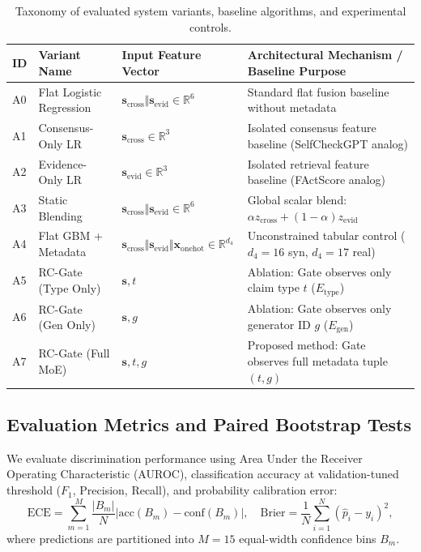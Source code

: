 \documentclass[pdflatex,sn-mathphys,Numbered]{sn-jnl}
\begin{document}
\begin{table}[htbp]
\caption{Taxonomy of evaluated system variants, baseline algorithms, and experimental controls.}\label{tab:variants_full}
\footnotesize
\setlength{\tabcolsep}{3.5pt}
\begin{tabular}{@{}llll@{}}
\toprule
\textbf{ID} & \textbf{Variant Name} & \textbf{Input Feature Vector} & \textbf{Architectural Mechanism / Baseline Purpose} \\
\midrule
A0 & Flat Logistic Regression & $\mathbf{s}_{\mathrm{cross}} \Vert \mathbf{s}_{\mathrm{evid}} \in \mathbb{R}^6$ & Standard flat fusion baseline without metadata \\
A1 & Consensus-Only LR & $\mathbf{s}_{\mathrm{cross}} \in \mathbb{R}^3$ & Isolated consensus feature baseline (SelfCheckGPT analog) \\
A2 & Evidence-Only LR & $\mathbf{s}_{\mathrm{evid}} \in \mathbb{R}^3$ & Isolated retrieval feature baseline (FActScore analog) \\
A3 & Static Blending & $\mathbf{s}_{\mathrm{cross}} \Vert \mathbf{s}_{\mathrm{evid}} \in \mathbb{R}^6$ & Global scalar blend: $\alpha z_{\mathrm{cross}} + (1-\alpha) z_{\mathrm{evid}}$ \\
A4 & Flat GBM + Metadata & $\mathbf{s}_{\mathrm{cross}} \Vert \mathbf{s}_{\mathrm{evid}} \Vert \mathbf{x}_{\mathrm{onehot}} \in \mathbb{R}^{d_4}$ & Unconstrained tabular control ($d_4=16$ syn, $d_4=17$ real) \\
A5 & RC-Gate (Type Only) & $\mathbf{s}, t$ & Ablation: Gate observes only claim type $t$ ($E_{\mathrm{type}}$) \\
A6 & RC-Gate (Gen Only) & $\mathbf{s}, g$ & Ablation: Gate observes only generator ID $g$ ($E_{\mathrm{gen}}$) \\
A7 & RC-Gate (Full MoE) & $\mathbf{s}, t, g$ & Proposed method: Gate observes full metadata tuple $(t, g)$ \\
\bottomrule
\end{tabular}
\end{table}

\subsection{Evaluation Metrics and Paired Bootstrap Tests}\label{subsec:metrics}

We evaluate discrimination performance using Area Under the Receiver Operating Characteristic (AUROC), classification accuracy at validation-tuned threshold ($F_1$, Precision, Recall), and probability calibration error:
\begin{equation}
\mathrm{ECE} = \sum_{m=1}^M \frac{|B_m|}{N} \left| \mathrm{acc}(B_m) - \mathrm{conf}(B_m) \right|, \quad \mathrm{Brier} = \frac{1}{N} \sum_{i=1}^N (\hat{p}_i - y_i)^2,
\end{equation}
where predictions are partitioned into $M=15$ equal-width confidence bins $B_m$.
\end{document}

